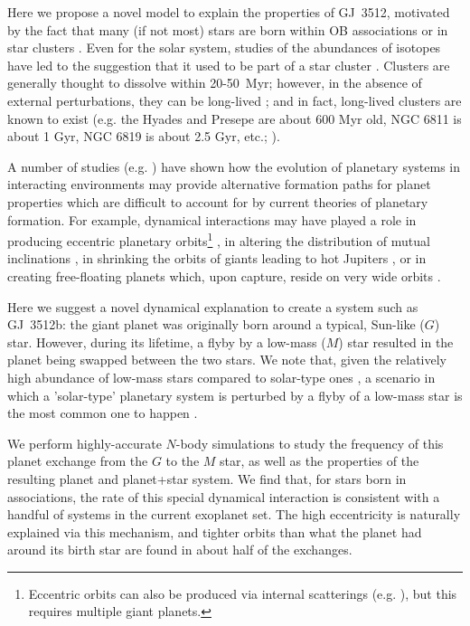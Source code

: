 \documentclass[twocolumn]{aastex62}
\begin{document}
Here we propose a novel model to explain the properties of GJ~3512,
motivated by the fact that many (if not most) stars are born within
OB associations or in star clusters \citep{Clarke2000,
Lada2003}. Even for the solar system, studies of the abundances of isotopes have
led to the suggestion that it used to be part of a star cluster \citep{Adams2001}.  Clusters are
generally thought to dissolve within 20-50~Myr; however, in the absence of external perturbations, they can be long-lived \citep{deGrijs2009}; and in fact, long-lived clusters are known
to exist (e.g.  the Hyades and Presepe are about 600 Myr old, NGC 6811 is about 1 Gyr, NGC 6819 is about 2.5 Gyr, etc.;  \citealt{Meibom2015,meibom18}).


A number of studies (e.g.  \citealt{Heggie1996,Laughlin1998, Davies2001,Bonnell2001,Thies2005,Olczak2010,Chatterjee2012,Portegies2015,
Cai2017,Cai2018,Rice2018,Cai2019,
vanelteren2019, Flammini2019,Kremer2019}) have shown how the evolution of planetary systems in
interacting environments may  provide alternative
formation paths for planet properties which are difficult to account for
by current theories of planetary formation. For example, dynamical
interactions may have played a role in producing 
eccentric planetary orbits\footnote{\color{red} Eccentric orbits can also be produced via internal scatterings (e.g. \citealt{Chatterjee2008}), but this requires multiple giant planets.} \citep{Rasio1996,DelaFuente1997,Juric2008,Beauge2012}, in 
altering the distribution of mutual inclinations \citep{Boley2012}, in shrinking the orbits of giants leading
to hot Jupiters \citep{Shara2016,Hamers2017}, or in creating free-floating planets which, upon
capture, reside on very wide orbits \citep{Perets2012}.

Here we suggest a novel dynamical explanation to create a system such
as GJ~3512b: the giant planet was originally born around a typical,
Sun-like ($G$) star. However, during its lifetime, a flyby by a
low-mass ($M$) star resulted in the planet being swapped between the
two stars. 
We note that, given the relatively high abundance of low-mass stars compared to solar-type ones \citep{Scalo1979}, a scenario in which a 'solar-type' planetary system is perturbed by a flyby of a low-mass star is the most common one to happen \citep{leigh12,leigh15}.



We perform highly-accurate $N$-body simulations to study
the frequency of this planet exchange from the $G$ to the $M$ star, as
well as the properties of the resulting planet and planet+star system.
We find that, for stars born in associations, the rate of this special
dynamical interaction is consistent with a handful of systems in the
current exoplanet set. The high eccentricity is naturally explained
via this mechanism, and tighter orbits than what the planet had
around its birth star are found in about half of the exchanges.
\end{document}
